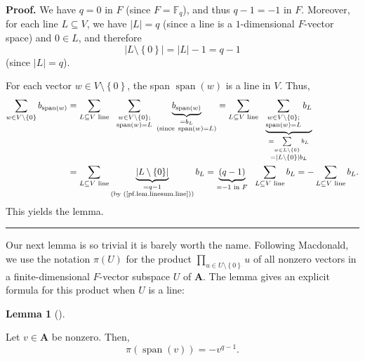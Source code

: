 \documentclass[numbers=enddot,12pt,final,onecolumn,notitlepage]{scrartcl}%
\numberwithin{exer}{section}
\theoremstyle{definition}
\newtheorem{lem}[theo]{Lemma}
\newenvironment{lemma}[1][]
{\begin{lem}[#1]\begin{leftbar}}
{\end{leftbar}\end{lem}}
\newenvironment{proof}[1][Proof]{\noindent\textbf{#1.} }{\ \rule{0.5em}{0.5em}}
\let\sumnonlimits\sum
\let\prodnonlimits\prod
\renewcommand{\sum}{\sumnonlimits\limits}
\renewcommand{\prod}{\prodnonlimits\limits}
\theoremstyle{plainsl}
\begin{document}
\begin{proof}
We have $q=0$ in $F$ (since $F=\mathbb{F}_{q}$), and thus $q-1=-1$ in $F$.
Moreover, for each line $L\subseteq V$, we have $\left\vert L\right\vert =q$
(since a line is a $1$-dimensional $F$-vector space) and $0\in L$, and
therefore%
\begin{equation}
\left\vert L\setminus\left\{  0\right\}  \right\vert =\left\vert L\right\vert
-1=q-1 \label{pf.lem.linesum.line}%
\end{equation}
(since $\left\vert L\right\vert =q$).

For each vector $w\in V\setminus\left\{  0\right\}  $, the span
$\operatorname*{span}\left(  w\right)  $ is a line in $V$. Thus,%
\begin{align*}
\sum_{w\in V\setminus\left\{  0\right\}  }b_{\operatorname*{span}\left(
w\right)  }  &  =\sum_{L\subseteq V\text{ line}}\ \ \sum_{\substack{w\in
V\setminus\left\{  0\right\}  ;\\\operatorname*{span}\left(  w\right)
=L}}\ \underbrace{b_{\operatorname*{span}\left(  w\right)  }}%
_{\substack{=b_{L}\\\text{(since }\operatorname*{span}\left(  w\right)
=L\text{)}}}=\sum_{L\subseteq V\text{ line}}\ \ \underbrace{\sum
_{\substack{w\in V\setminus\left\{  0\right\}  ;\\\operatorname*{span}\left(
w\right)  =L}}b_{L}}_{\substack{=\sum_{w\in L\setminus\left\{  0\right\}
}b_{L}\\=\left\vert L\setminus\left\{  0\right\}  \right\vert b_{L}}}\\
&  =\sum_{L\subseteq V\text{ line}}\underbrace{\left\vert L\setminus\left\{
0\right\}  \right\vert }_{\substack{=q-1\\\text{(by (\ref{pf.lem.linesum.line}%
))}}}b_{L}=\underbrace{\left(  q-1\right)  }_{=-1\text{ in }F}\ \ \sum
_{L\subseteq V\text{ line}}b_{L}=-\sum_{L\subseteq V\text{ line}}b_{L}.
\end{align*}
This yields the lemma.
\end{proof}

Our next lemma is so trivial it is barely worth the name. Following Macdonald,
we use the notation $\pi\left(  U\right)  $ for the product $\prod_{u\in
U\setminus\left\{  0\right\}  }u$ of all nonzero vectors in a
finite-dimensional $F$-vector subspace $U$ of $\mathbf{A}$. The lemma gives an
explicit formula for this product when $U$ is a line:

\begin{lemma}
\label{lem.pispanv}Let $v\in\mathbf{A}$ be nonzero. Then,%
\begin{equation}
\pi\left(  \operatorname*{span}\left(  v\right)  \right)  =-v^{q-1}.
\label{eq.pispanV}%
\end{equation}

\end{lemma}
\end{document}
